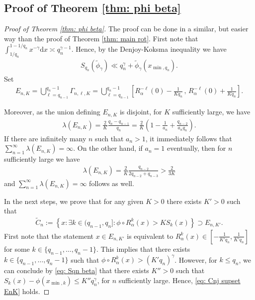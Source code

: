 \documentclass[11pt]{amsart}
\theoremstyle{definition}
\numberwithin{equation}{section}
\begin{document}
\subsection{Proof of Theorem \ref{thm: phi beta}}
\begin{proof}[Proof of Theorem \ref{thm: phi beta}]
 The proof can be done in a similar, but easier way than the proof of Theorem \ref{thm: main rot}. First note that 
 $\int_{1/q_n}^{ 1-1/q_n} x^{-\gamma}\mathrm{d}x\asymp q_n^{\gamma-1}$. 
Hence, by the Denjoy-Koksma inequality we have 
\begin{align}
 S_{q_n}(\widetilde{\phi}_{\gamma})\ll q_n^{\gamma}+\widetilde{\phi}_{\gamma}(x_{\min, q_n}). \label{eq: Sqn beta}
\end{align}
Set 
\begin{align*}
 E_{n,K}= \bigcup_{\ell=q_{n-1}}^{q_n-1} \Gamma_{n,\ell,K}=\bigcup_{\ell=q_{n-1}}^{q_n-1}\left[ R_\alpha^{-\ell}(0)-\frac{1}{Kq_n} \, ,\, R_\alpha^{-\ell}(0) +\frac{1}{Kq_n} \right].
\end{align*}


Moreover, as the union defining $E_{n,K}$ is disjoint, for $K$ sufficiently large, we have \begin{align*}
 \lambda(E_{n,K})=\frac{2}{K}\frac{q_n-q_{n-1}}{q_{n}}
 =\frac{2}{K}\left(1-\frac{1}{a_n}+\frac{q_{n-2}}{a_nq_{n}}\right).
\end{align*}
If there are infinitely many $n$ such that $a_n>1$, it immediately follows that $\sum_{n=1}^{\infty}\lambda(E_{n,K})=\infty$.
On the other hand, if $a_n=1$ eventually, then for $n$ sufficiently large we have 
\begin{align*}
 \lambda(E_{n,K})
 =\frac{2}{K}\frac{q_{n-2}}{2q_{n-2}+q_{n-3}}>\frac{2}{3K}
\end{align*}
and $\sum_{n=1}^{\infty}\lambda(E_{n,K})=\infty$ follows as well.

In the next steps, we prove that for any given $K>0$ there exists $K'>0$ such that
 \begin{align}
  \widetilde{C}_{n}:=\left\{x: \exists k\in ( q_{n-1},q_n]: \phi\circ R_{\alpha}^k(x)> K S_{k}(x) \right\} \supset E_{n, K'}.\label{eq: Cnj supset EnK}
 \end{align}
First note that the statement $ x\in E_{n,K'}$ is equivalent to
$R_{\alpha}^k(x)\in [-\frac{1}{K'q_n}, \frac{1}{K'q_n}]$ for some $k\in \{q_{n-1},\ldots, q_n-1\}$. This implies that there exists $k\in \{q_{n-1},\ldots, q_n-1\}$ such that 
$\phi\circ R_{\alpha}^k(x)>(K'q_n)^{\gamma}$.
However, for $k\leq q_n$, we can conclude by \eqref{eq: Sqn beta} that there exists $K''>0$ such that $S_{k}(x)-\phi(x_{\min,k})\leq  K'' q_n^{\gamma}$, for $n$ sufficiently large.
Hence, \eqref{eq: Cnj supset EnK} holds. 


\end{proof}
\end{document}

